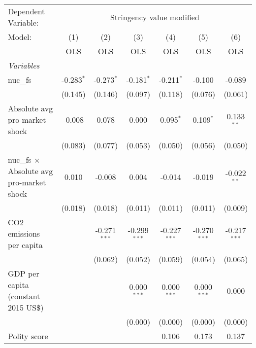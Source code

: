 
\begingroup
\centering
\begin{tabular}{lcccccc}
   \toprule
   Dependent Variable: & \multicolumn{6}{c}{Stringency value modified}\\
   Model:                                           & (1)          & (2)            & (3)            & (4)            & (5)            & (6)\\  
                                                    &  OLS         & OLS            & OLS            & OLS            & OLS            & OLS\\  
   \midrule
   \emph{Variables}\\
   nuc\_fs                                          & -0.283$^{*}$ & -0.273$^{*}$   & -0.181$^{*}$   & -0.211$^{*}$   & -0.100         & -0.089\\   
                                                    & (0.145)      & (0.146)        & (0.097)        & (0.118)        & (0.076)        & (0.061)\\   
   Absolute avg pro-market shock                    & -0.008       & 0.078          & 0.000          & 0.095$^{*}$    & 0.109$^{*}$    & 0.133$^{**}$\\   
                                                    & (0.083)      & (0.077)        & (0.053)        & (0.050)        & (0.056)        & (0.050)\\   
   nuc\_fs $\times$ Absolute avg pro-market shock   & 0.010        & -0.008         & 0.004          & -0.014         & -0.019         & -0.022$^{**}$\\   
                                                    & (0.018)      & (0.018)        & (0.011)        & (0.011)        & (0.011)        & (0.009)\\   
   CO2 emissions per capita                         &              & -0.271$^{***}$ & -0.299$^{***}$ & -0.227$^{***}$ & -0.270$^{***}$ & -0.217$^{***}$\\   
                                                    &              & (0.062)        & (0.052)        & (0.059)        & (0.054)        & (0.065)\\   
   GDP per capita (constant 2015 US\$)              &              &                & 0.000$^{***}$  & 0.000$^{***}$  & 0.000$^{***}$  & 0.000\\   
                                                    &              &                & (0.000)        & (0.000)        & (0.000)        & (0.000)\\   
   Polity score                                     &              &                &                & 0.106          & 0.173          & 0.137\\   

\end{tabular}
